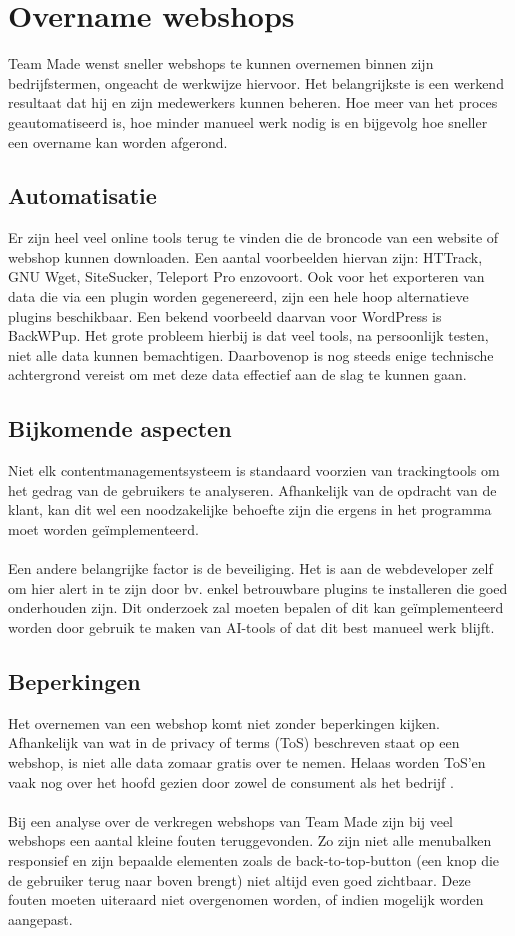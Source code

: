 \section{Overname webshops}
Team Made wenst sneller webshops te kunnen overnemen binnen zijn bedrijfstermen, ongeacht de werkwijze hiervoor. Het belangrijkste is een werkend resultaat dat hij en zijn medewerkers kunnen beheren. Hoe meer van het proces geautomatiseerd is, hoe minder manueel werk nodig is en bijgevolg hoe sneller een overname kan worden afgerond.
\subsection{Automatisatie}
Er zijn heel veel online tools terug te vinden die de broncode van een website of webshop kunnen downloaden. Een aantal voorbeelden hiervan zijn: HTTrack, GNU Wget, SiteSucker, Teleport Pro enzovoort. Ook voor het exporteren van data die via een plugin worden gegenereerd, zijn een hele hoop alternatieve plugins beschikbaar. Een bekend voorbeeld daarvan voor WordPress is BackWPup. Het grote probleem hierbij is dat veel tools, na persoonlijk testen, niet alle data kunnen bemachtigen. Daarbovenop is nog steeds enige technische achtergrond vereist om met deze data effectief aan de slag te kunnen gaan.  
\subsection{Bijkomende aspecten}
Niet elk contentmanagementsysteem is standaard voorzien van trackingtools om het gedrag van de gebruikers te analyseren. Afhankelijk van de opdracht van de klant, kan dit wel een noodzakelijke behoefte zijn die ergens in het programma moet worden geïmplementeerd. \autocite{DeBruijn2013}
\\\\
Een andere belangrijke factor is de beveiliging. Het is aan de webdeveloper zelf om hier alert in te zijn door bv. enkel betrouwbare plugins te installeren die goed onderhouden zijn. Dit onderzoek zal moeten bepalen of dit kan geïmplementeerd worden door gebruik te maken van AI-tools of dat dit best manueel werk blijft. \autocite{Bottelbergs2013}   
\subsection{Beperkingen}
Het overnemen van een webshop komt niet zonder beperkingen kijken. Afhankelijk van wat in de privacy of terms (ToS) beschreven staat op een webshop, is niet alle data zomaar gratis over te nemen. Helaas worden ToS'en vaak nog over het hoofd gezien door zowel de consument als het bedrijf \autocite{Braun2019}.  
\\\\
Bij een analyse over de verkregen webshops van Team Made zijn bij veel webshops een aantal kleine fouten teruggevonden. Zo zijn niet alle menubalken responsief en zijn bepaalde elementen zoals de back-to-top-button (een knop die de gebruiker terug naar boven brengt) niet altijd even goed zichtbaar. Deze fouten moeten uiteraard niet overgenomen worden, of indien mogelijk worden aangepast.  

